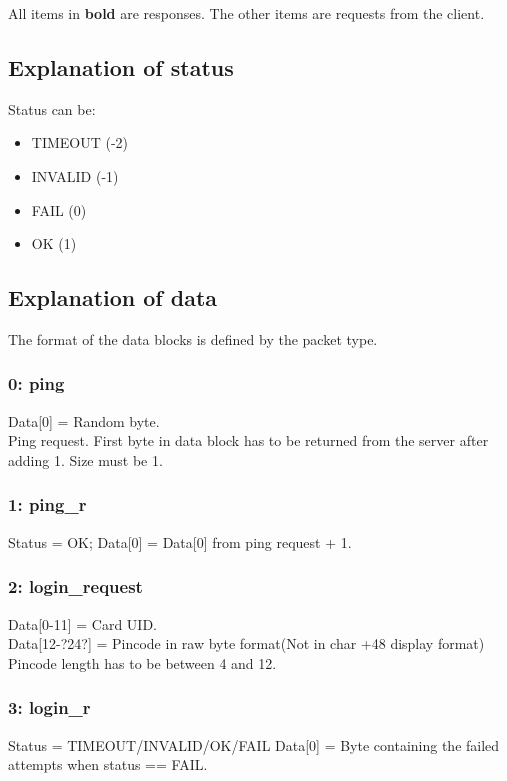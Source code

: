 \documentclass[12pt, a4paper]{article}
\begin{document}
All items in \textbf{bold} are responses. The other items are requests from the client.

\subsection{Explanation of status}
Status can be:\\
\begin{itemize}
	\item TIMEOUT (-2)
	\item INVALID (-1)
	\item FAIL (0)
	\item OK (1)
\end{itemize}

\subsection{Explanation of data}
The format of the data blocks is defined by the packet type.\\

\subsubsection{0: ping}
Data[0] = Random byte.\\

Ping request. First byte in data block has to be returned from the server after adding 1.
Size must be 1.

\subsubsection{1: ping\_r}
Status = OK;
Data[0] = Data[0] from ping request + 1.

\subsubsection{2: login\_request}
Data[0-11] = Card UID.\\
Data[12-?24?] = Pincode in raw byte format(Not in char +48 display format)\\
Pincode length has to be between 4 and 12.

\subsubsection{3: login\_r}
Status = TIMEOUT/INVALID/OK/FAIL
Data[0] = Byte containing the failed attempts when status == FAIL.
\end{document}
